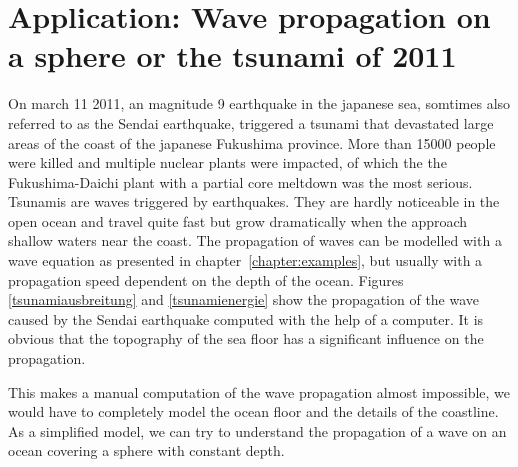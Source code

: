 %
%
%

\section{Application: Wave propagation on a sphere or the tsunami of 2011}
On march 11 2011, an magnitude 9 earthquake in the japanese sea,
somtimes also referred to as the Sendai earthquake, triggered a 
tsunami that devastated large areas of the coast of the japanese
Fukushima province.
More than 15000 people were killed and multiple nuclear plants
were impacted, of which the the Fukushima-Daichi plant with a
partial core meltdown was the most serious.
Tsunamis are waves triggered by earthquakes.
They are hardly noticeable in the open ocean and travel quite fast
but grow dramatically when the approach shallow waters near the coast.
The propagation of waves can be modelled with a wave equation as
presented in chapter~\ref{chapter:examples}, but usually with
a propagation speed dependent on the depth of the ocean.
Figures \ref{tsunamiausbreitung} and \ref{tsunamienergie}
show the propagation of the wave caused by the Sendai earthquake
computed with the help of a computer.
It is obvious that the topography of the sea floor has a significant
influence on the propagation.

This makes a manual computation of the wave propagation almost
impossible, we would have to completely model the ocean floor and
the details of the coastline.
As a simplified model, we can try to understand the propagation of a
wave on an ocean covering a sphere with constant depth.

